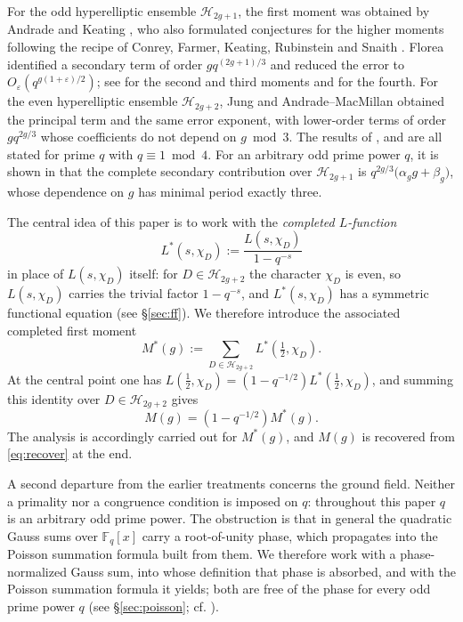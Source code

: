 \documentclass[a4paper,reqno]{amsart}
\numberwithin{equation}{section}
\theoremstyle{remark}
\theoremstyle{definition}
\begin{document}
For the odd hyperelliptic ensemble $\mathcal H_{2g+1}$, the first moment was
obtained by Andrade and Keating \cite{AK12}, who also formulated conjectures
for the higher moments \cite{AK14} following the recipe of Conrey, Farmer,
Keating, Rubinstein and Snaith \cite{CFKRS}. Florea \cite{Fl17-1} identified
a secondary term of order $gq^{(2g+1)/3}$ and reduced the error to
$O_\varepsilon(q^{g(1+\varepsilon)/2})$; see \cite{Fl17-2} for the second and
third moments and \cite{Fl17-3} for the fourth. For the even hyperelliptic ensemble $\mathcal H_{2g+2}$,
Jung \cite{Ju20} and Andrade--MacMillan \cite{AM-21} obtained the principal
term and the same error exponent, with lower-order terms of order
$gq^{2g/3}$ whose coefficients do not depend on $g\bmod3$. The results of
\cite{Fl17-1}, \cite{Ju20} and \cite{AM-21} are all stated for prime $q$
with $q\equiv1\bmod4$. For an arbitrary odd prime power $q$, it is shown in
\cite{Ju26} that the complete secondary contribution over
$\mathcal H_{2g+1}$ is $q^{2g/3}\bigl(\alpha_gg+\beta_g\bigr)$, whose
dependence on $g$ has minimal period exactly three.

The central idea of this paper is to work with the \emph{completed
$L$-function}
$$
L^*(s,\chi_D):=\frac{L(s,\chi_D)}{1-q^{-s}}
$$
in place of $L(s,\chi_D)$ itself: for $D\in\mathcal H_{2g+2}$ the character
$\chi_D$ is even, so $L(s,\chi_D)$ carries the trivial factor $1-q^{-s}$,
and $L^*(s,\chi_D)$ has a symmetric functional equation (see \S\ref{sec:ff}). 
We therefore introduce the associated completed first
moment
\begin{equation}\label{eq:completed_moment_intro}
M^*(g)
:=
\sum_{D\in\mathcal H_{2g+2}}
L^*\!\left(\tfrac12,\chi_D\right).
\end{equation}
At the central point one has
$L\!\left(\tfrac12,\chi_D\right)=(1-q^{-1/2})L^*\!\left(\tfrac12,\chi_D\right)$,
and summing this identity over $D\in\mathcal H_{2g+2}$ gives
\begin{equation}\label{eq:recover}
M(g)
=
(1-q^{-1/2})M^*(g).
\end{equation}
The analysis is accordingly carried out for $M^*(g)$, and $M(g)$ is
recovered from \eqref{eq:recover} at the end.

A second departure from the earlier treatments concerns the ground field.
Neither a primality nor a congruence condition is imposed on $q$: throughout
this paper $q$ is an arbitrary odd prime power. The obstruction is that in
general the quadratic Gauss sums over $\mathbb F_q[x]$ carry a root-of-unity
phase, which propagates into the Poisson summation formula built from them.
We therefore work with a phase-normalized Gauss sum, into whose definition
that phase is absorbed, and with the Poisson summation formula it yields;
both are free of the phase for every odd prime power $q$
(see \S\ref{sec:poisson}; cf. \cite[Section~9]{Fl17-1}).
\end{document}
